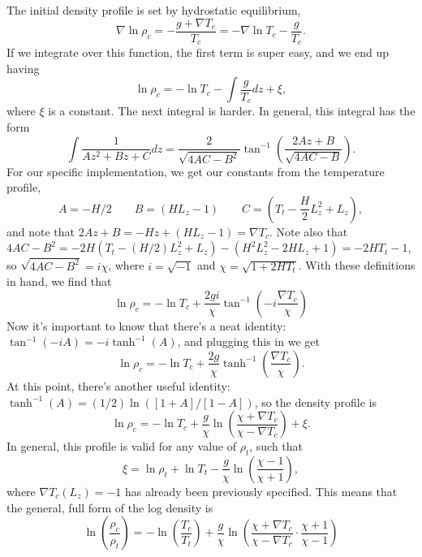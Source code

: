 \documentclass[aps, pre, onecolumn, nofootinbib, notitlepage, groupedaddress, amsfonts, amssymb, amsmath, longbibliography]{revtex4-1}
\newcommand{\grad}{\ensuremath{\nabla}}
\begin{document}
The initial density profile is set by hydrostatic equilibrium,
\begin{equation}
\grad\ln\rho_c = -\frac{g + \grad T_c}{T_c} = -\grad\ln T_c- \frac{g}{T_c}.
\end{equation}
If we integrate over this function, the first term is super easy, and we end up having
\begin{equation}
\ln\rho_c = - \ln T_c - \int\frac{g}{T_c}dz + \xi,
\end{equation}
where $\xi$ is a constant.  The next integral is harder.  In general, this integral has the form
\begin{equation}
\int \frac{1}{Az^2 + Bz + C}dz = \frac{2}{\sqrt{4 AC - B^2}} \tan^{-1}\left(\frac{2 Az + B}{\sqrt{4 AC - B}}\right).
\end{equation}
For our specific implementation, we get our constants from the temperature profile,
$$
A = -H / 2 \qquad B = (HL_z - 1) \qquad C = \left(T_t - \frac{H}{2}L_z^2 + L_z\right),
$$
and note that $2Az + B = -Hz + (HL_z - 1) = \grad T_c$.  Note also that
$4AC - B^2 = -2H(T_t - (H/2)L_z^2 + L_z) - (H^2 L_z^2 - 2HL_z + 1) = -2HT_t - 1$,
so $\sqrt{4AC - B^2} = i\chi$, where $i = \sqrt{-1}$ and $\chi = \sqrt{1 + 2HT_t}$.
With these definitions in hand, we find that
\begin{equation}
\ln\rho_c = -\ln T_c + \frac{2 g i}{\chi}\tan^{-1}\left(-i\frac{\grad T_c}{\chi}\right)
\end{equation}
Now it's important to know that there's a neat identity: $\tan^{-1}(-i A) = -i\tanh^{-1}(A)$,
and plugging this in we get
\begin{equation}
\ln\rho_c = -\ln T_c + \frac{2 g}{\chi}\tanh^{-1}\left(\frac{\grad T_c}{\chi}\right).
\end{equation}
At this point, there's another useful identity: $\tanh^{-1}(A) = (1/2)\ln([1 + A]/[1 - A])$,
so the density profile is
\begin{equation}
\ln\rho_c = -\ln T_c + \frac{g}{\chi}\ln\left(\frac{\chi + \grad T_c}{\chi - \grad T_c}\right) + \xi.
\end{equation}
In general, this profile is valid for any value of $\rho_t$, such that
\begin{equation}
\xi = \ln\rho_t + \ln T_t - \frac{g}{\chi}\ln\left(\frac{\chi - 1}{\chi + 1}\right),
\end{equation}
where $\grad T_c(L_z) = -1$ has already been previously specified.  This means that the general,
full form of the log density is
\begin{equation}
\ln\left(\frac{\rho_c}{\rho_t}\right) = -\ln\left(\frac{T_c}{T_t}\right) + 
\frac{g}{\chi}\ln\left(\frac{\chi + \grad T_c}{\chi - \grad T_c}\cdot\frac{\chi + 1}{\chi - 1}\right)
\end{equation}
\end{document}
